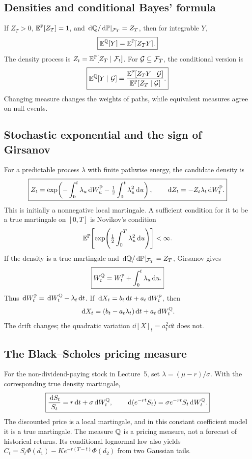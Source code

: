 \subsection{Densities and conditional Bayes' formula}

If \(Z_T>0\), \(\mathbb{E}^{\mathbb{P}}[Z_T]=1\), and
\(\,\mathrm{d}\mathbb{Q}/\,\mathrm{d}\mathbb{P}|_{\mathcal{F}_T}=Z_T\), then for integrable \(Y\),
\[
\boxed{\mathbb{E}^{\mathbb{Q}}[Y]=\mathbb{E}^{\mathbb{P}}[Z_TY].}
\]
The density process is \(Z_t=\mathbb{E}^{\mathbb{P}}[Z_T\mid\mathcal{F}_t]\). For
\(\mathcal G\subseteq\mathcal{F}_T\), the conditional version is
\[
\boxed{
\mathbb{E}^{\mathbb{Q}}[Y\mid\mathcal G]
=\frac{\mathbb{E}^{\mathbb{P}}[Z_TY\mid\mathcal G]}
       {\mathbb{E}^{\mathbb{P}}[Z_T\mid\mathcal G]}.}
\]
Changing measure changes the weights of paths, while equivalent
measures agree on null events.

\subsection{Stochastic exponential and the sign of Girsanov}

For a predictable process \(\lambda\) with finite pathwise energy, the
candidate density is
\[
\boxed{
Z_t=\exp\!\left(
-\int_0^t\lambda_u\,\mathrm{d} W_u^{\mathbb{P}}
-\tfrac12\int_0^t\lambda_u^2\,\mathrm{d} u\right),
\qquad
\,\mathrm{d} Z_t=-Z_t\lambda_t\,\mathrm{d} W_t^{\mathbb{P}}.}
\]
This is initially a nonnegative local martingale. A sufficient
condition for it to be a true martingale on \([0,T]\) is Novikov's
condition
\[
\mathbb{E}^{\mathbb{P}}\!\left[
\exp\!\left(\tfrac12\int_0^T\lambda_u^2\,\mathrm{d} u\right)\right]<\infty.
\]
If the density is a true martingale and
\(\,\mathrm{d}\mathbb{Q}/\,\mathrm{d}\mathbb{P}|_{\mathcal{F}_T}=Z_T\), Girsanov gives
\[
\boxed{
W_t^{\mathbb{Q}}=W_t^{\mathbb{P}}+\int_0^t\lambda_u\,\mathrm{d} u.}
\]
Thus \(\,\mathrm{d} W_t^{\mathbb{P}}=\,\mathrm{d} W_t^{\mathbb{Q}}-\lambda_t\,\mathrm{d} t\). If
\(\,\mathrm{d} X_t=b_t\,\mathrm{d} t+a_t\,\mathrm{d} W_t^{\mathbb{P}}\), then
\[
\,\mathrm{d} X_t=(b_t-a_t\lambda_t)\,\mathrm{d} t+a_t\,\mathrm{d} W_t^{\mathbb{Q}}.
\]
The drift changes; the quadratic variation
\(\dd[X]_t=a_t^2\dd t\) does not.

\subsection{The Black--Scholes pricing measure}

For the non-dividend-paying stock in Lecture~5, set
\(\lambda=(\mu-r)/\sigma\). With the corresponding true density
martingale,
\[
\boxed{
\frac{\,\mathrm{d} S_t}{S_t}=r\,\mathrm{d} t+\sigma\,\mathrm{d} W_t^{\mathbb{Q}},
\qquad
\,\mathrm{d}(e^{-rt}S_t)=\sigma e^{-rt}S_t\,\mathrm{d} W_t^{\mathbb{Q}}.}
\]
The discounted price is a local martingale, and in this constant
coefficient model it is a true martingale. The measure \(\mathbb{Q}\)
is a pricing measure, not a forecast of historical returns. Its
conditional lognormal law also yields
\(C_t=S_t\Phi(d_1)-Ke^{-r(T-t)}\Phi(d_2)\) from two Gaussian
tails.

